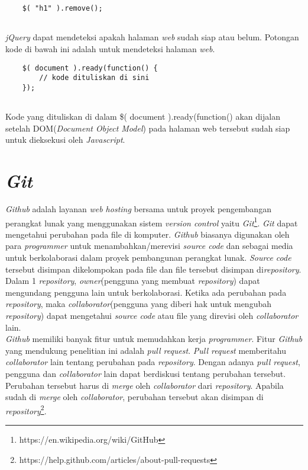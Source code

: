 \begin{lstlisting}
	$( "h1" ).remove();
	
\end{lstlisting}

\textit{jQuery} dapat mendeteksi apakah halaman \textit{web} sudah siap atau belum. Potongan kode di bawah ini adalah untuk mendeteksi halaman \textit{web}.

\begin{lstlisting}
	$( document ).ready(function() {
    	// kode dituliskan di sini
	});
	
\end{lstlisting}

Kode yang dituliskan di dalam \$( document ).ready(function() akan dijalan setelah DOM(\textit{Document Object Model}) pada halaman web tersebut sudah siap untuk dieksekusi oleh \textit{Javascript}. 

\section{\textit{Git}}
\label{sec:Git}
\textit{Github} adalah layanan \textit{web hosting} bersama untuk proyek pengembangan perangkat lunak yang menggunakan sistem \textit{version control} yaitu \textit{Git}\footnote{https://en.wikipedia.org/wiki/GitHub}. \textit{Git} dapat mengetahui perubahan pada file di komputer. \textit{Github} biasanya digunakan oleh para \textit{programmer} untuk menambahkan/merevisi \textit{source code} dan sebagai media untuk berkolaborasi dalam proyek pembangunan perangkat lunak. \textit{Source code} tersebut disimpan dikelompokan pada file dan file tersebut disimpan di\textit{repository}. Dalam 1 \textit{repository}, \textit{owner}(pengguna yang membuat \textit{repository}) dapat mengundang pengguna lain untuk berkolaborasi. Ketika ada perubahan pada \textit{repository}, maka \textit{collaborator}(pengguna yang diberi hak untuk mengubah \textit{repository}) dapat mengetahui \textit{source code} atau file yang direvisi oleh \textit{collaborator} lain.\\

\textit{Github} memiliki banyak fitur untuk memudahkan kerja \textit{programmer}. Fitur \textit{Github} yang mendukung penelitian ini adalah \textit{pull request}. \textit{Pull request} memberitahu \textit{collaborator} lain tentang perubahan pada \textit{repository}. Dengan adanya \textit{pull request}, pengguna dan \textit{collaborator} lain dapat berdiskusi tentang perubahan tersebut. Perubahan tersebut harus di \textit{merge} oleh \textit{collaborator} dari \textit{repository}. Apabila sudah di \textit{merge} oleh \textit{collaborator}, perubahan tersebut akan disimpan di \textit{repository}\footnote{https://help.github.com/articles/about-pull-requests}.